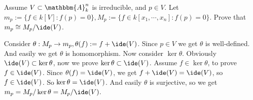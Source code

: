 \documentclass{ctexart}
\newif\ifpreface
\begin{document}
\large
\setlength{\baselineskip}{1.2em}
\ifpreface

\newgeometry{left=2cm,right=2cm,top=2cm,bottom=2cm}
\else
{}
\maketitle
\fi
\begin{problem}
  Assume \(V \subset \mathbbm{A}_k^{n}\) is irreducible, and \(p \in V\).
  Let \(m_p := \{f \in k[V] : f(p) = 0\}, M_p := \{f \in k[x_1,\cdots,x_n]: f(p) = 0\}\).
  Prove that \(m_p \cong M_p/\ide(V)\).
\end{problem}

\begin{solution}
  Consider \( \theta : M_p \to m_p ,\theta(f) := f + \ide(V)\).
  Since \( p \in V\) we get \(\theta\) is well-defined.
  And easily we get \(\theta\) is homomorphism. Now consider \(\ker \theta\).
  Obviously \(\ide(V) \subset \ker \theta\), now we prove \(\ker \theta \subset \ide(V)\).
  Assume \( f \in \ker\theta\), to prove \(f \in \ide(V)\).
  Since \(\theta(f)=\ide(V)\), we get \(f+\ide(V)=\ide(V)\), so \(f \in \ide(V)\).
  So \(\ker \theta = \ide(V)\). And easily \(\theta\) is surjective, so we get
  \(m_p=M_p/\ker \theta=M_p / \ide(V)\).
\end{solution}
\end{document}
